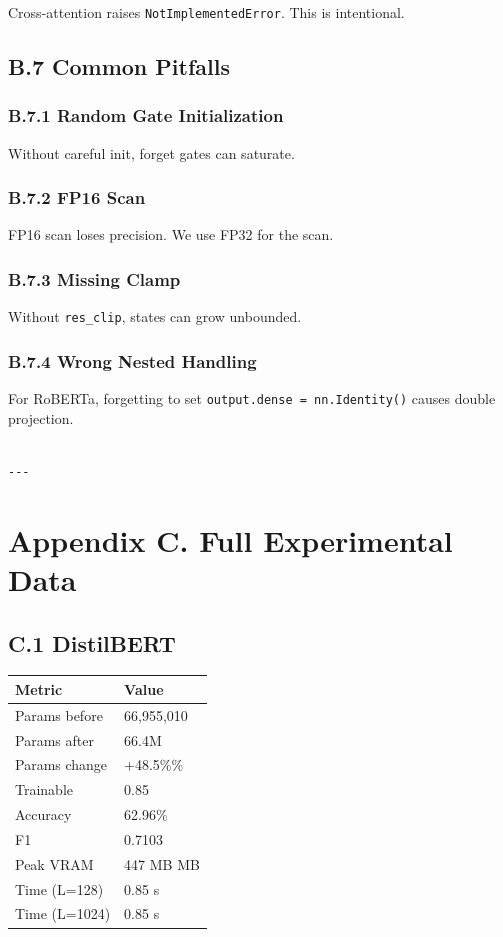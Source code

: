 Cross-attention raises \texttt{NotImplementedError}. This is intentional.

\subsection{B.7 Common Pitfalls}

\subsubsection{B.7.1 Random Gate Initialization}

Without careful init, forget gates can saturate.

\subsubsection{B.7.2 FP16 Scan}

FP16 scan loses precision. We use FP32 for the scan.

\subsubsection{B.7.3 Missing Clamp}

Without \texttt{res\_clip}, states can grow unbounded.

\subsubsection{B.7.4 Wrong Nested Handling}

For RoBERTa, forgetting to set \texttt{output.dense = nn.Identity()} causes 
double projection.
\begin{lstlisting}

---
\end{lstlisting}

\section{Appendix C. Full Experimental Data}

\subsection{C.1 DistilBERT}

\begin{table}[H]
\centering
\small
\begin{tabular}{ll}
\toprule
\textbf{Metric} & \textbf{Value} \\
\midrule
Params before & 66,955,010 \\
Params after & 66.4M \\
Params change & +48.5\%\% \\
Trainable & 0.85 \\
Accuracy & 62.96\% \\
F1 & 0.7103 \\
Peak VRAM & 447 MB MB \\
Time (L=128) & 0.85 s \\
Time (L=1024) & 0.85 s \\
\bottomrule
\end{tabular}
\end{table}

